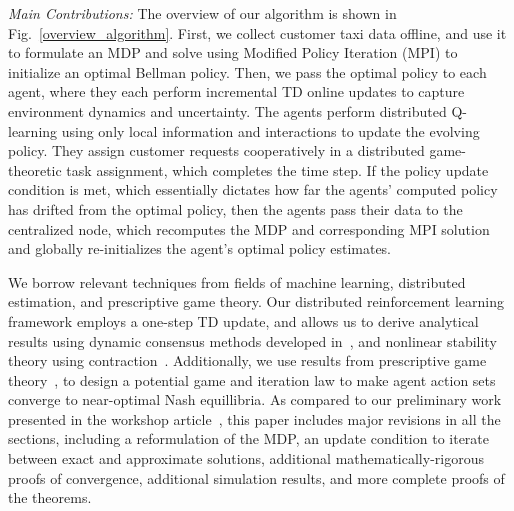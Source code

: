 \documentclass[journal]{IEEEtran}
\begin{document}
\emph{Main Contributions:} 
The overview of our algorithm is shown in Fig.~\ref{overview_algorithm}. First, we collect customer taxi data offline, and use it to formulate an MDP and solve using Modified Policy Iteration (MPI) to initialize an optimal Bellman policy. Then, we pass the optimal policy to each agent, where they each perform incremental TD online updates to capture environment dynamics and uncertainty. The agents perform distributed Q-learning using only local information and interactions to update the evolving policy. They assign customer requests cooperatively in a distributed game-theoretic task assignment, which completes the time step. If the policy update condition is met, which essentially dictates how far the agents' computed policy has drifted from the optimal policy, then the agents pass their data to the centralized node, which recomputes the MDP and corresponding MPI solution and globally re-initializes the agent's optimal policy estimates.

We borrow relevant techniques from fields of machine learning, distributed estimation, and prescriptive game theory. Our distributed reinforcement learning framework employs a one-step TD update, and allows us to derive analytical results using dynamic consensus methods developed in~\cite{DBF, saberFax2007,saber_2009}, and nonlinear stability theory using contraction~\cite{slotine_1998,slotine_contraction}. Additionally, we use results from prescriptive game theory~\cite{robust5,robust7,revisiting}, to design a potential game and iteration law to make agent action sets converge to near-optimal Nash equillibria. As compared to our preliminary work presented in the workshop article~\cite{priorWork}, this paper includes major revisions in all the sections, including a reformulation of the MDP, an update condition to iterate between exact and approximate solutions, additional mathematically-rigorous proofs of convergence, additional simulation results, and more complete proofs of the theorems. 
\end{document}
